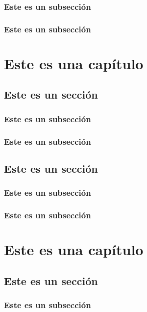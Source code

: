 \documentclass[11pt,oneside]{book}
\begin{document}
\subsection{Este es un subsección}
\lipsum[1-1]
\subsection{Este es un subsección}
\lipsum[1-2]



\chapter{Este es una capítulo}
\section{Este es un sección}
\subsection{Este es un subsección}
\lipsum[1-3]

\subsection{Este es un subsección}
\lipsum[1-2]

\section{Este es un sección}
\subsection{Este es un subsección}
\lipsum[1-1]
\subsection{Este es un subsección}
\lipsum[1-2]

\chapter{Este es una capítulo}
\section{Este es un sección}
\subsection{Este es un subsección}
\lipsum[1-3]
\end{document}
